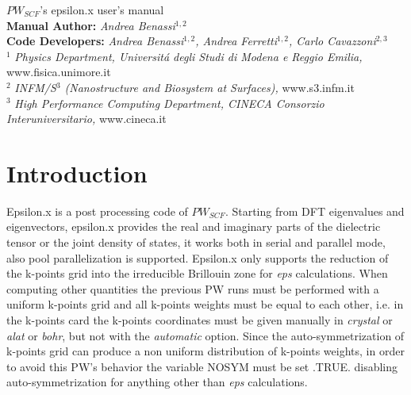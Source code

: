 \documentclass[twocolumn]{article}
\begin{document}
\begin{titlepage}
\Huge
\begin{center}
$PW_{SCF}$'s epsilon.x user's manual\\[4.5cm]
\normalsize
\vspace{10.5cm}
\textbf{Manual Author:}
\emph{Andrea Benassi}$^{1,2}$\\[0.3cm]
\textbf{Code Developers:}
\emph{Andrea Benassi$^{1,2}$, Andrea Ferretti$^{1,2}$, Carlo Cavazzoni$^{2,3}$}\\[1cm]
$^{1}$ \emph{Physics Department, Universit\'a degli Studi di Modena e Reggio Emilia,} www.fisica.unimore.it\\
$^{2}$ \emph{INFM/S$^{3}$ (Nanostructure and Biosystem at Surfaces),} www.s3.infm.it\\
$^{3}$ \emph{High Performance Computing Department, CINECA Consorzio Interuniversitario,} www.cineca.it\\
\end{center}
\end{titlepage}
\newpage
\section{Introduction}
Epsilon.x is a post processing code of $PW_{SCF}$. Starting from DFT eigenvalues and eigenvectors,
epsilon.x provides the real and imaginary parts of the dielectric tensor or the joint density of states, it works both in serial and
parallel mode, also pool parallelization is supported.
Epsilon.x only supports the reduction of the k-points grid into the irreducible Brillouin zone for \emph{eps} 
calculations. When computing other quantities the previous PW runs must be
performed with a uniform k-points grid and all k-points weights must be equal to each other, i.e. in the k-points card the k-points
coordinates must be given manually in \emph{crystal} or \emph{alat} or \emph{bohr}, but not with the \emph{automatic} option. Since the
auto-symmetrization of k-points grid can produce a non uniform distribution of k-points weights, in order to avoid this
PW's behavior the variable NOSYM must be set .TRUE. disabling auto-symmetrization for anything other than \emph{eps} calculations.
\end{document}
